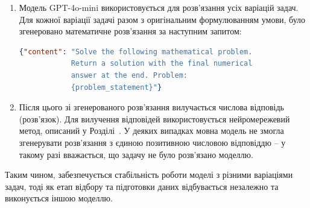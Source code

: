 \begin{enumerate}
    \item Модель GPT-4o-mini використовується для розв'язання усіх варіацій задач. Для кожної варіації задачі разом з оригінальним формулюванням умови, було згенеровано математичне розв'язання за наступним запитом:
\begin{lstlisting}[language=json, breaklines=true]
{"content": "Solve the following mathematical problem. 
            Return a solution with the final numerical 
            answer at the end. Problem: 
            {problem_statement}"}
\end{lstlisting}
    
    \item Після цього зі згенерованого розв'язання вилучається числова відповідь (розв'язок). Для вилучення відповідей використовується нейромережевий метод, описаний у Розділі~. У деяких випадках мовна модель не змогла згенерувати розв'язання з єдиною позитивною числовою відповіддю -- у такому разі вважається, що задачу не було розв'язано моделлю.
\end{enumerate}

Таким чином, забезпечується стабільність роботи моделі з різними варіаціями задач, тоді як етап відбору та підготовки даних відбувається незалежно та виконується іншою моделлю.

